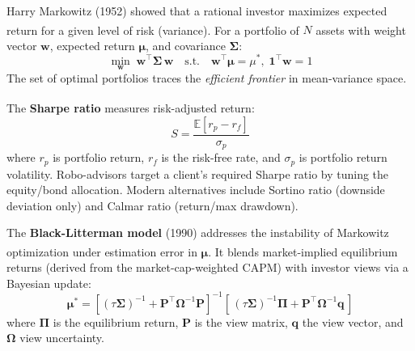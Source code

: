 \begin{tcbitemize}[ skin=sectionraster ]

    \tcbitem[title=Modern Portfolio Theory (Markowitz), raster multicolumn=3]
    Harry Markowitz (1952) showed that a rational investor maximizes expected return for a given level of risk (variance)\textsuperscript{\cite[][p.~127]{jansenMachineLearningAlgorithmic2020}}.
    For a portfolio of $N$ assets with weight vector $\mathbf{w}$, expected return $\boldsymbol{\mu}$, and covariance $\boldsymbol{\Sigma}$:
    \begin{equation}
        \min_{\mathbf{w}}\; \mathbf{w}^\top \boldsymbol{\Sigma}\, \mathbf{w} \quad \text{s.t.} \quad \mathbf{w}^\top \boldsymbol{\mu} = \mu^*, \; \mathbf{1}^\top \mathbf{w} = 1
    \end{equation}
    The set of optimal portfolios traces the \emph{efficient frontier} in mean-variance space.

    \tcbitem[title=Sharpe Ratio and Risk-Adjusted Performance, raster multicolumn=3]
    The \textbf{Sharpe ratio} measures risk-adjusted return\textsuperscript{\cite[][p.~122]{jansenMachineLearningAlgorithmic2020}}:
    \begin{equation}
        S = \frac{\mathbb{E}[r_p - r_f]}{\sigma_p}
    \end{equation}
    where $r_p$ is portfolio return, $r_f$ is the risk-free rate, and $\sigma_p$ is portfolio return volatility.
    Robo-advisors target a client's required Sharpe ratio by tuning the equity/bond allocation.
    Modern alternatives include Sortino ratio (downside deviation only) and Calmar ratio (return/max drawdown).

    \tcbitem[title=Black-Litterman Model, raster multicolumn=3]
    The \textbf{Black-Litterman model} (1990) addresses the instability of Markowitz optimization under estimation error in $\boldsymbol{\mu}$\textsuperscript{\cite[][pp.~131--132]{jansenMachineLearningAlgorithmic2020}}.
    It blends market-implied equilibrium returns (derived from the market-cap-weighted CAPM) with investor views via a Bayesian update:
    \begin{equation}
        \boldsymbol{\mu}^* = [(\tau \boldsymbol{\Sigma})^{-1} + \mathbf{P}^\top \boldsymbol{\Omega}^{-1} \mathbf{P}]^{-1}[\,(\tau \boldsymbol{\Sigma})^{-1} \boldsymbol{\Pi} + \mathbf{P}^\top \boldsymbol{\Omega}^{-1} \mathbf{q}\,]
    \end{equation}
    where $\boldsymbol{\Pi}$ is the equilibrium return, $\mathbf{P}$ is the view matrix, $\mathbf{q}$ the view vector, and $\boldsymbol{\Omega}$ view uncertainty.


\end{tcbitemize}
